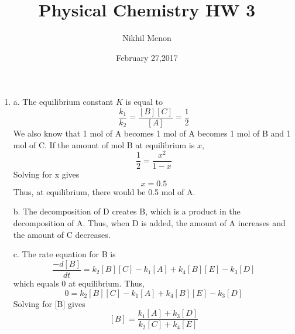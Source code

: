 \documentclass{article}
\title{Physical Chemistry HW 3}
\author{Nikhil Menon}
\date{February 27,2017}
\begin{document}
\maketitle
\begin{enumerate}
\item  
a. The equilibrium constant $K$ is equal to
$$\frac{k_1}{k_2}=\frac{[B][C]}{[A]}=\frac{1}{2}$$
We also know that 1 mol of A becomes 1 mol of A becomes 1 mol of B and 1 mol of C. If the amount of mol B at equilibrium is $x$,
$$\frac{1}{2}=\frac{x^2}{1-x}$$
Solving for x gives
$$x=0.5$$
Thus, at equilibrium, there would be 0.5 mol of A.

b. The decomposition of D creates B, which is a product in the decomposition of A. Thus, when D is added, the amount of A increases and the amount of C decreases.

c. The rate equation for B is
$$\frac{-d[B]}{dt}=k_2[B][C]-k_1[A]+k_4[B][E]-k_3[D]$$
which equals 0 at equilibrium. Thus,
$$0=k_2[B][C]-k_1[A]+k_4[B][E]-k_3[D]$$
Solving for [B] gives
$$[B]=\frac{k_1[A]+k_3[D]}{k_2[C]+k_4[E]}$$
\end{enumerate}
\end{document}
